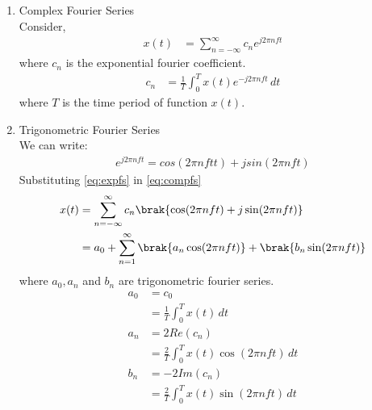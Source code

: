 \begin{enumerate}[label=\thechapter.\arabic*,ref=\thechapter.\theenumi]

\item Complex Fourier Series\\
Consider,
\begin{align}
	x(t) &= \sum_{n=-\infty}^{\infty} c_{n}e^{j2\pi nft}
	\label{eq:compfs}
\end{align}
where $c_{n}$ is the exponential fourier coefficient.
\begin{align}
        c_{n} &= \frac{1}{T} \int_{0}^{T} x(t) e^{-j2\pi nft} \, dt
\end{align}
where $T$ is the time period of function $x(t)$.
\item Trigonometric Fourier Series\\
We can write:
\begin{align}
	e^{j2\pi nft} = cos(2\pi nft t) + j sin(2\pi nft)
	\label{eq:expfs}
\end{align}
Substituting \eqref{eq:expfs} in \eqref{eq:compfs}
\begin{align}
	 x(t) &= \sum_{n=-\infty}^{\infty} c_{n} \brak{\cos(2\pi nft) + j \sin(2\pi nft)}\\
	      &= a_0 + \sum_{n=1}^{\infty} \brak{a_{n} \cos(2\pi nft)} + \brak{b_{n} \sin(2\pi nft)}
\end{align}
where $a_0, a_{n}$ and $b_{n}$ are trigonometric fourier series.
\begin{align}
          a_{0} &= c_{0}\\
                &=\frac{1}{T} \int_{0}^{T} x(t) \, dt\\
          a_{n} &= 2Re(c_{n})\\
                &=\frac{2}{T} \int_{0}^{T} x(t)\cos(2\pi nft) \, dt\\
          b_{n} &= -2Im(c_{n})\\
                &= \frac{2}{T} \int_{0}^{T} x(t)\sin(2\pi nft) \, dt
\end{align}
\end{enumerate}

